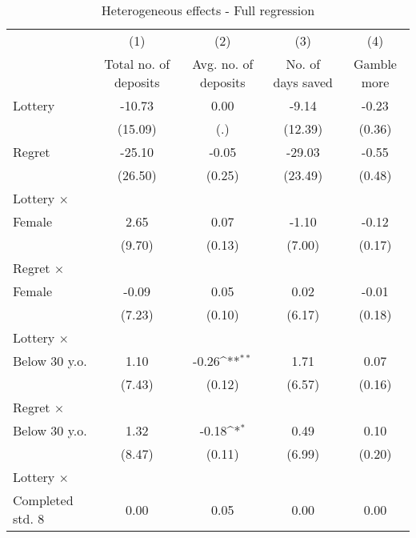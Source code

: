 \begin{table}[htbp]\centering
\def\sym#1{\ifmmode^{#1}\else\(^{#1}\)\fi}
\caption{Heterogeneous effects - Full regression}
\begin{tabular}{l*{4}{c}}
\toprule
                &\multicolumn{1}{c}{(1)}&\multicolumn{1}{c}{(2)}&\multicolumn{1}{c}{(3)}&\multicolumn{1}{c}{(4)}\\
                &\multicolumn{1}{c}{Total no. of deposits}&\multicolumn{1}{c}{Avg. no. of deposits}&\multicolumn{1}{c}{No. of days saved}&\multicolumn{1}{c}{Gamble more}\\
\midrule
Lottery         &   -10.73         &     0.00         &    -9.14         &    -0.23         \\
                &  (15.09)         &      (.)         &  (12.39)         &   (0.36)         \\
\addlinespace
Regret          &   -25.10         &    -0.05         &   -29.03         &    -0.55         \\
                &  (26.50)         &   (0.25)         &  (23.49)         &   (0.48)         \\
\addlinespace
Lottery $\times$ \\ Female&     2.65         &     0.07         &    -1.10         &    -0.12         \\
                &   (9.70)         &   (0.13)         &   (7.00)         &   (0.17)         \\
\addlinespace
Regret $\times$ \\ Female&    -0.09         &     0.05         &     0.02         &    -0.01         \\
                &   (7.23)         &   (0.10)         &   (6.17)         &   (0.18)         \\
\addlinespace
Lottery $\times$ \\ Below 30 y.o.&     1.10         &    -0.26\sym{**} &     1.71         &     0.07         \\
                &   (7.43)         &   (0.12)         &   (6.57)         &   (0.16)         \\
\addlinespace
Regret $\times$ \\ Below 30 y.o.&     1.32         &    -0.18\sym{*}  &     0.49         &     0.10         \\
                &   (8.47)         &   (0.11)         &   (6.99)         &   (0.20)         \\
\addlinespace
Lottery $\times$ \\ Completed std. 8&     0.00         &     0.05         &     0.00         &     0.00         \\

\end{tabular}
\end{table}
